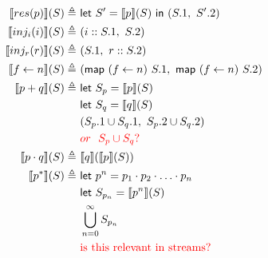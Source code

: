 \documentclass[12pt, letterpaper]{article}
\newcommand\interp[1]{\llbracket #1 \rrbracket}
\begin{document}
\begin{align*}
        \interp { res(p) }(S)
            \triangleq\ &
            \mathsf{let}\ S'
            = \interp {p}(S)\ 
            \mathsf{in}\ (S.1,\ S'.2)
            \\
        \interp { inj_{i}(i) }(S)
            \triangleq\ &
            (i :: S.1,\  S.2)
            \\
        \interp { inj_{r}(r) }(S)
            \triangleq\ &
            (S.1,\ r::S.2)
            \\
        \interp { f \leftarrow n }(S)
            \triangleq\ &
            (\mathsf{map}\ (f\leftarrow n)\ S.1,\
             \mathsf{map}\ (f\leftarrow n)\ S.2)
            \\ %
         \interp { p + q }(S)
            \triangleq\ &
            \mathsf{let}\ S_p =
            \interp { p }(S) 
            \\
            &\mathsf{let}\ S_q =
            \interp { q }(S) 
            \\
            &(S_p.1 \cup S_q.1,\ S_p.2 \cup S_q.2) 
            \\
            & \textcolor{red}{ or\ \ S_p \cup S_q ?}\\%
        \interp { p \cdot q }(S)
            \triangleq\ &
            \interp{q}(\interp{p}(S))\\
        \interp { p ^{*} } (S)
            \triangleq\ &
            \mathsf{let}\ p^{n} = p_{1} \cdot p_{2} \cdot \ldots \cdot p_{n}
            \\
            &\mathsf{let}\ S_{p_{n}} = \interp { p^{n} } (S)
            \\
            &\bigcup^{\infty}_{n=0} S_{p_{n}}
            \\
            & \textcolor{red}{\text{is this relevant in streams?}}\\
    \end{align*}
\end{document}
